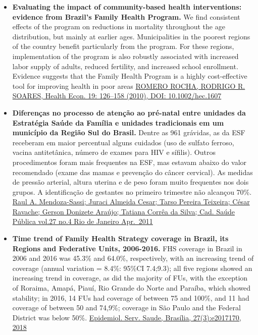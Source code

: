\documentclass[]{book}
\begin{document}
\begin{itemize}
\item
  \textbf{Evaluating the impact of community-based health interventions: evidence from Brazil's Family Health Program.} We find consistent effects of the program on reductions in mortality throughout the age distribution, but mainly at earlier ages. Municipalities in the poorest regions of the country benefit particularly from the program. For these regions, implementation of the program is also robustly associated with increased labor supply of adults, reduced fertility, and increased school enrollment. Evidence suggests that the Family Health Program is a highly cost-effective tool for improving health in poor areas \href{https://sci-hub.tw/10.1002/hec.1607}{ROMERO ROCHA, RODRIGO R. SOARES, Health Econ. 19: 126--158 (2010), DOI: 10.1002/hec.1607}
\item
  \textbf{Diferenças no processo de atenção ao pré-natal entre unidades da Estratégia Saúde da Família e unidades tradicionais em um município da Região Sul do Brasil.} Dentre as 961 grávidas, as da ESF receberam em maior percentual alguns cuidados (uso de sulfato ferroso, vacina antitetânica, número de exames para HIV e sífilis). Outros procedimentos foram mais frequentes na ESF, mas estavam abaixo do valor recomendado (exame das mamas e prevenção do câncer cervical). As medidas de pressão arterial, altura uterina e de peso foram muito frequentes nos dois grupos. A identificação de gestantes no primeiro trimestre não alcançou 70\%. \href{http://www.scielo.br/scielo.php?script=sci_arttext\&pid=S0102-311X2011000400018}{Raul A. Mendoza-Sassi; Juraci Almeida Cesar; Tarso Pereira Teixeira; César Ravache; Gerson Donizete Araújo; Tatiana Corrêa da Silva; Cad. Saúde Pública vol.27 no.4 Rio de Janeiro Apr.~2011}
\item
  \textbf{Time trend of Family Health Strategy coverage in Brazil, its Regions and Federative Units, 2006-2016.} FHS coverage in Brazil in 2006 and 2016 was 45.3\% and 64.0\%, respectively, with an increasing trend of coverage (annual variation = 8.4\%: 95\%CI 7.4;9.3); all five regions showed an increasing trend in coverage, as did the majority of FUs, with the exception of Roraima, Amapá, Piauí, Rio Grande do Norte and Paraíba, which showed stability; in 2016, 14 FUs had coverage of between 75 and 100\%, and 11 had coverage of between 50 and 74,9\%; coverage in São Paulo and the Federal District was below 50\%. \href{https://www.scielosp.org/pdf/ress/2018.v27n3/e2017170/en}{Epidemiol. Serv. Saude, Brasília, 27(3):e2017170, 2018}
\end{itemize}
\end{document}
